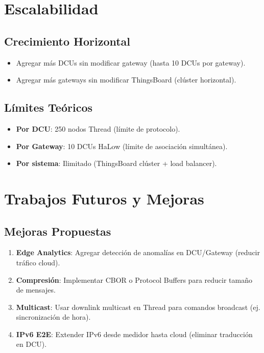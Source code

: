 \section{Escalabilidad}

\subsection{Crecimiento Horizontal}

\begin{itemize}
    \item Agregar más DCUs sin modificar gateway (hasta 10 DCUs por gateway).
    \item Agregar más gateways sin modificar ThingsBoard (clúster horizontal).
\end{itemize}

\subsection{Límites Teóricos}

\begin{itemize}
    \item \textbf{Por DCU}: 250 nodos Thread (límite de protocolo).
    \item \textbf{Por Gateway}: 10 DCUs HaLow (límite de asociación simultánea).
    \item \textbf{Por sistema}: Ilimitado (ThingsBoard clúster + load balancer).
\end{itemize}

\section{Trabajos Futuros y Mejoras}

\subsection{Mejoras Propuestas}

\begin{enumerate}
    \item \textbf{Edge Analytics}: Agregar detección de anomalías en DCU/Gateway (reducir tráfico cloud).
    \item \textbf{Compresión}: Implementar CBOR o Protocol Buffers para reducir tamaño de mensajes.
    \item \textbf{Multicast}: Usar downlink multicast en Thread para comandos broadcast (ej. sincronización de hora).
    \item \textbf{IPv6 E2E}: Extender IPv6 desde medidor hasta cloud (eliminar traducción en DCU).
\end{enumerate}

